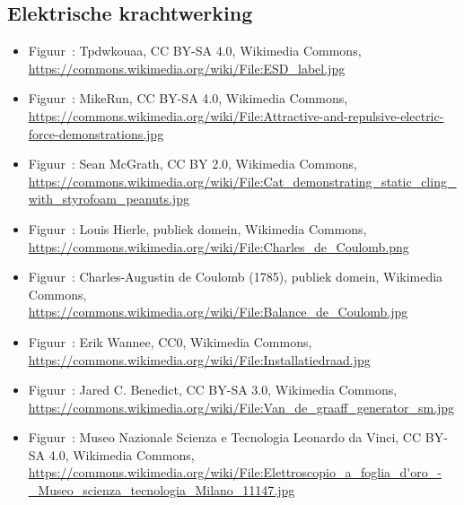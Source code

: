 \documentclass{ximera}
\begin{document}
\subsection*{Elektrische krachtwerking}
\begin{itemize}
        \item Figuur~: Tpdwkouaa, CC BY-SA 4.0, Wikimedia Commons, \url{https://commons.wikimedia.org/wiki/File:ESD_label.jpg}
        \item Figuur~: MikeRun, CC BY-SA 4.0, Wikimedia Commons, \url{https://commons.wikimedia.org/wiki/File:Attractive-and-repulsive-electric-force-demonstrations.jpg}
        \item Figuur~: Sean McGrath, CC BY 2.0, Wikimedia Commons, \url{https://commons.wikimedia.org/wiki/File:Cat_demonstrating_static_cling_with_styrofoam_peanuts.jpg}
        \item Figuur~: Louis Hierle, publiek domein, Wikimedia Commons, \url{https://commons.wikimedia.org/wiki/File:Charles_de_Coulomb.png}
        \item Figuur~: Charles-Augustin de Coulomb (1785), publiek domein, Wikimedia Commons, \url{https://commons.wikimedia.org/wiki/File:Balance_de_Coulomb.jpg}
        \item Figuur~: Erik Wannee, CC0, Wikimedia Commons, \url{https://commons.wikimedia.org/wiki/File:Installatiedraad.jpg}
        \item Figuur~: Jared C. Benedict, CC BY-SA 3.0, Wikimedia Commons, \url{https://commons.wikimedia.org/wiki/File:Van_de_graaff_generator_sm.jpg}
        \item Figuur~: Museo Nazionale Scienza e Tecnologia Leonardo da Vinci, CC BY-SA 4.0, Wikimedia Commons, \url{https://commons.wikimedia.org/wiki/File:Elettroscopio_a_foglia_d'oro_-_Museo_scienza_tecnologia_Milano_11147.jpg}

\end{itemize}
\end{document}
